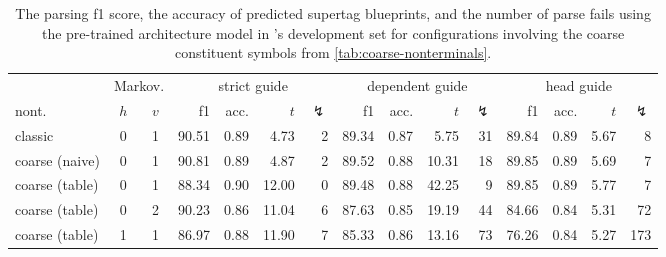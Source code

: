 \documentclass[../../document.tex]{subfiles}
\begin{document}
    \begin{table}
        \caption{\label{tbl:gridsearch:coarse:3}
        The parsing f1 score, the accuracy of predicted supertag blueprints, and the number of parse fails using the pre-trained architecture model in \negra{}'s development set for configurations involving the coarse constituent symbols from \cref{tab:coarse-nonterminals}.
        }
        \centering
        \vspace{.2cm}
        \setlength{\tabcolsep}{3.5pt}
        \begin{tabular}{lcc|rrrr|rrrr|rrrr}
            \toprule
    & \multicolumn{2}{c|}{Markov.}         & \multicolumn{4}{c|}{strict guide} &  \multicolumn{4}{c|}{dependent guide} &  \multicolumn{4}{c}{head guide} \\
    nont.           & \(h\) & \(v\) & f1 & acc. & $t$ & $\lightning$ & f1 & acc. & $t$ & $\lightning$  & f1 & acc. & $t$ & $\lightning$  \\ \hline\rowcolor{black!10}
classic        & 0 & 1 & 90.51 & 0.89 &  4.73 & 2 & 89.34 & 0.87 &  5.75 & 31 & 89.84 & 0.89 & 5.67 & 8 \\\rowcolor{black!10}
coarse (naive) & 0 & 1 & 90.81 & 0.89 &  4.87 & 2 & 89.52 & 0.88 & 10.31 & 18 & 89.85 & 0.89 & 5.69 & 7 \\\hline
coarse (table) & 0 & 1 & 88.34 & 0.90 & 12.00 & 0 & 89.48 & 0.88 & 42.25 &  9 & 89.85 & 0.89 & 5.77 & 7 \\
coarse (table) & 0 & 2 & 90.23 & 0.86 & 11.04 & 6 & 87.63 & 0.85 & 19.19 & 44 & 84.66 & 0.84 & 5.31 & 72 \\
coarse (table) & 1 & 1 & 86.97 & 0.88 & 11.90 & 7 & 85.33 & 0.86 & 13.16 & 73 & 76.26 & 0.84 & 5.27 & 173 \\
\bottomrule
        \end{tabular}
    \end{table}
    
\end{document}
